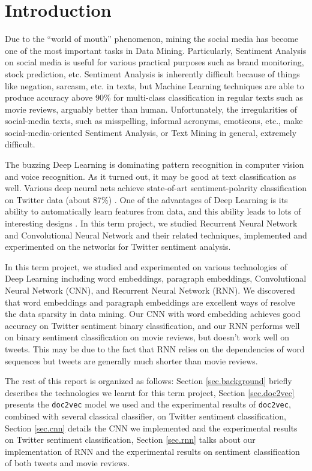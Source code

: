 \section{Introduction}

Due to the ``world of mouth'' phenomenon, mining the social media has become one of the most important tasks in Data Mining. Particularly, Sentiment Analysis on social media is useful for various practical purposes such as brand monitoring, stock prediction, etc. Sentiment Analysis is inherently difficult because of things like negation, sarcasm, etc. in texts, but Machine Learning techniques are able to produce accuracy above 90\% for multi-class classification in regular texts such as movie reviews, arguably better than human. Unfortunately, the irregularities of social-media texts, such as misspelling, informal acronyms, emoticons, etc., make social-media-oriented Sentiment Analysis, or Text Mining in general, extremely difficult. 

The buzzing Deep Learning is dominating pattern recognition in computer vision and voice recognition. As it turned out, it may be good at text classification as well. Various deep neural nets achieve state-of-art sentiment-polarity classification on Twitter data (about 87\%) \cite{kalchbrenner2014, kim2014, wang2015}. One of the advantages of Deep Learning is its ability to automatically learn features from data, and this ability leads to lots of interesting designs \cite{dos2014, kalchbrenner2014, kim2014, socher2013, wang2015}. In this term project, we studied Recurrent Neural Network and Convolutional Neural Network and their related techniques, implemented and experimented on the networks for Twitter sentiment analysis. 

In this term project, we studied and experimented on various technologies of Deep Learning including word embeddings, paragraph embeddings, Convolutional Neural Network (CNN), and Recurrent Neural Network (RNN). We discovered that word embeddings and paragraph embeddings are excellent ways of resolve the data sparsity in data mining. Our CNN with word embedding achieves good accuracy on Twitter sentiment binary classification, and our RNN performs well on binary sentiment classification on movie reviews, but doesn't work well on tweets. This may be due to the fact that RNN relies on the dependencies of word sequences but tweets are generally much shorter than movie reviews. 

The rest of this report is organized as follows: Section \ref{sec.background} briefly describes the technologies we learnt for this term project, Section \ref{sec.doc2vec} presents the {\tt doc2vec} model we used and the experimental results of {\tt doc2vec}, combined with several classical classifier, on Twitter sentiment classification, Section \ref{sec.cnn} details the CNN we implemented and the experimental results on Twitter sentiment classification, Section \ref{sec.rnn} talks about our implementation of RNN and the experimental results on sentiment classification of both tweets and movie reviews. 
